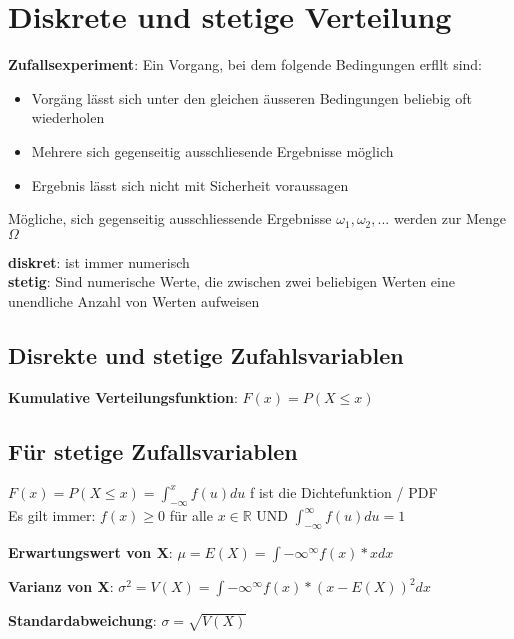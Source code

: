 \documentclass[STS.tex]{subfiles}
\begin{document}
\section{Diskrete und stetige Verteilung}

\textbf{Zufallsexperiment}: Ein Vorgang, bei dem folgende Bedingungen erfllt sind:
\begin{itemize}
    \item{Vorgäng lässt sich unter den gleichen äusseren Bedingungen beliebig oft wiederholen}
    \item{Mehrere sich gegenseitig ausschliesende Ergebnisse möglich}
    \item{Ergebnis lässt sich nicht mit Sicherheit voraussagen}
\end{itemize}


Mögliche, sich gegenseitig ausschliessende Ergebnisse $ \omega_1, \omega_2,... $ werden zur Menge $ \Omega $

\textbf{diskret}: ist immer numerisch \\
\textbf{stetig}: Sind numerische Werte, die zwischen zwei beliebigen Werten eine unendliche Anzahl von Werten aufweisen \\

\subsection{Disrekte und stetige Zufahlsvariablen}

\textbf{Kumulative Verteilungsfunktion}: $ F(x) = P (X \leq x)$

\subsection{Für stetige Zufallsvariablen}

$ F(x) = P(X \leq x)
=
 \int_{- \infty }^{x} f(u) du
$
\quad
f ist die Dichtefunktion / PDF \\

Es gilt immer: $ f(x) \geq 0 $ für alle $ x \in \mathbb{R} $
UND
$ \int_{- \infty }^{ \infty} f(u) du = 1
$

\textbf{Erwartungswert von X}:
$
\mu = E(X) = \int{ -\infty}^{ \infty} f(x) * x dx
$

\textbf{Varianz von X}:
$
\sigma^2 = V(X) = \int{- \infty}^{\infty} f(x) * (x- E(X))^2 dx
$

\textbf{Standardabweichung}:
$
\sigma = \sqrt{V(X)}
$
\end{document}
